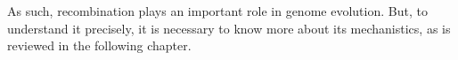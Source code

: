 As such, recombination plays an important role in genome evolution.
But, to understand it precisely, it is necessary to know more about its mechanistics, as is reviewed in the following chapter.


%
%
%
%
%
%
%










